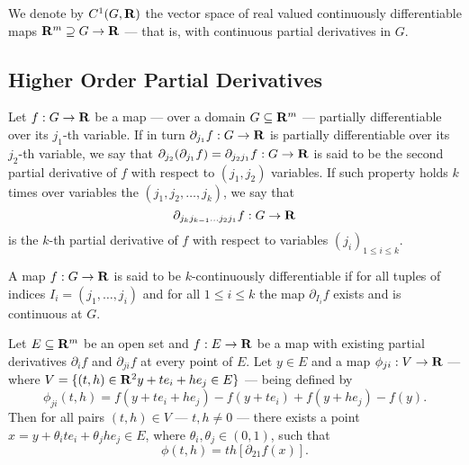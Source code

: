 \begin{definition}
  We denote by \(C^1(G, \mathbf{R})\) the vector space of real valued continuously
  differentiable maps \(\mathbf{R}^m \supseteq G \to \mathbf{R}\) --- that is, with continuous
  partial derivatives in \(G\).
\end{definition}

\subsection{Higher Order Partial Derivatives}

\begin{definition}
  \label{def: kth-partial}
  Let \(f: G \to \mathbf{R}\) be a map --- over a domain \(G \subseteq \mathbf{R}^m\) ---
  partially differentiable over its \(j_1\)-th variable. If in turn
  \(\partial_{j_1} f: G \to \mathbf{R}\) is partially differentiable over its \(j_2\)-th
  variable, we say that \(\partial_{j_2}(\partial_{j_1} f) = \partial_{j_2 j_1}
  f: G \to \mathbf{R}\) is said to be the second partial derivative of \(f\) with
  respect to \((j_1, j_2)\) variables. If such property holds \(k\) times over
  variables the \((j_1, j_2, \dots, j_k)\), we say that
  \[
    \partial_{j_k j_{k-1} \dots j_2 j_1} f: G \to \mathbf{R}
  \]
  is the \(k\)-th partial derivative of \(f\) with respect to variables
  \((j_i)_{1 \leq i \leq k}\).
\end{definition}

\begin{definition}
  A map \(f: G \to \mathbf{R}\) is said to be \(k\)-continuously differentiable if for
  all tuples of indices \(I_i = (j_1, \dots, j_i)\) and for all \(1 \leq i \leq
  k\) the map \(\partial_{I_i} f\) exists and is continuous at \(G\).
\end{definition}

\begin{lemma}\label{lem: order-var-partial}
  Let \(E \subseteq \mathbf{R}^m\) be an open set and \(f: E \to \mathbf{R}\) be a map with
  existing partial derivatives \(\partial_i f\) and \(\partial_{ji} f\) at every
  point of \(E\). Let \(y \in E\) and a map \(\phi_{ji}: V \to \mathbf{R}\) --- where
  \(V = \{(t, h) \in \mathbf{R}^2 \relax y + t e_i + h e_j \in E\} \) --- being defined by
  \[
    \phi_{ji}(t, h) = f(y + t e_i + h e_j) - f(y + t e_i) + f(y + h e_j) - f(y).
  \]
  Then for all pairs \((t, h) \in V\) --- \(t, h \neq 0\) --- there exists a
  point \(x = y + \theta_i t e_i + \theta_j h e_j \in E\), where \(\theta_i,
  \theta_j \in (0, 1)\), such that
  \[
    \phi(t, h) = t h [\partial_{2 1} f(x)].
  \]
\end{lemma}

